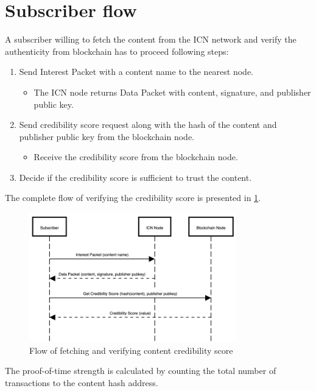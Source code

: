 \section{Subscriber flow}
A subscriber willing to fetch the content from the ICN network and verify the authenticity from blockchain has to proceed following steps:
\begin{enumerate}
    \item Send Interest Packet with a content name to the nearest node.
    \begin{itemize}
        \item The ICN node returns Data Packet with content, signature, and publisher public key.
    \end{itemize}
    \item Send credibility score request along with the hash of the content and publisher public key from the blockchain node.
    \begin{itemize}
        \item Receive the credibility score from the blockchain node.
    \end{itemize}
    \item Decide if the credibility score is sufficient to trust the content.
\end{enumerate}
The complete flow of verifying the credibility score is presented in \ref{fig:verifying-flow}.
\begin{figure}[h!]
\includegraphics[width=9cm]{img/verifying-flow.png}
\centering
\caption{Flow of fetching and verifying content credibility score}
\label{fig:verifying-flow}
\end{figure} 

The proof-of-time strength is calculated by counting the total number of transactions to the content hash address.

